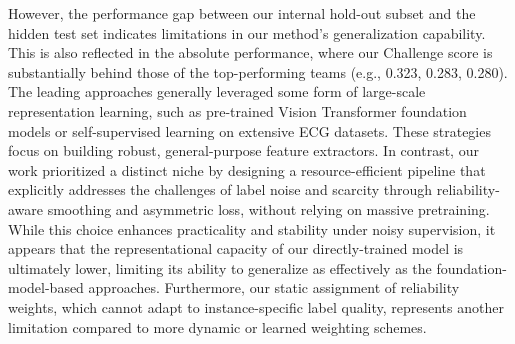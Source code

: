 However, the performance gap between our internal hold-out subset and the hidden test set indicates limitations in our method's generalization capability. This is also reflected in the absolute performance, where our Challenge score is substantially behind those of the top-performing teams (e.g., 0.323, 0.283, 0.280). The leading approaches generally leveraged some form of large-scale representation learning, such as pre-trained Vision Transformer foundation models or self-supervised learning on extensive ECG datasets. These strategies focus on building robust, general-purpose feature extractors. In contrast, our work prioritized a distinct niche by designing a resource-efficient pipeline that explicitly addresses the challenges of label noise and scarcity through reliability-aware smoothing and asymmetric loss, without relying on massive pretraining. While this choice enhances practicality and stability under noisy supervision, it appears that the representational capacity of our directly-trained model is ultimately lower, limiting its ability to generalize as effectively as the foundation-model-based approaches. Furthermore, our static assignment of reliability weights, which cannot adapt to instance-specific label quality, represents another limitation compared to more dynamic or learned weighting schemes.


